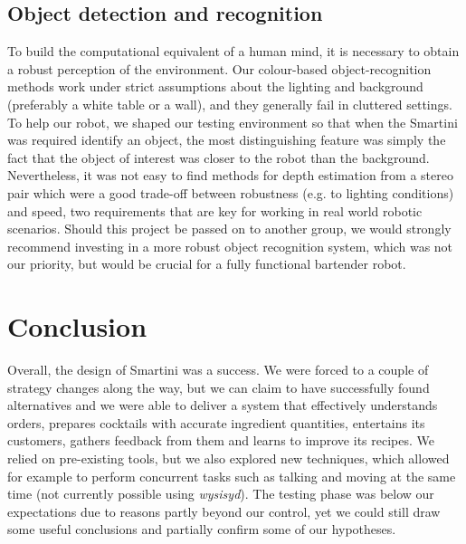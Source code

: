 \documentclass[conference]{IEEEtran}
\begin{document}
\subsection{Object detection and recognition}

To build the computational equivalent of a human mind, it is necessary to obtain a robust perception of the environment. Our colour-based object-recognition methods work under strict assumptions about the lighting and background (preferably a white table or a wall), and they generally fail in cluttered settings. To help our robot, we shaped our testing environment so that when the Smartini was required identify an object, the most distinguishing feature was simply the fact that the object of interest was closer to the robot than the background. Nevertheless, it was not easy to find methods for depth estimation from a stereo pair which were a good trade-off between robustness (e.g. to lighting conditions) and speed, two requirements that are key for working in real world robotic scenarios. Should this project be passed on to another group, we would strongly recommend investing in a more robust object recognition system, which was not our priority, but would be crucial for a fully functional bartender robot. 



\section{Conclusion}

Overall, the design of Smartini was a success. We were forced to a couple of strategy changes along the way, but we can claim to have successfully found alternatives and we were able to deliver a system that effectively understands orders, prepares cocktails with accurate ingredient quantities, entertains its customers, gathers feedback from them and learns to improve its recipes. We relied on pre-existing tools, but we also explored new techniques, which allowed for example to perform concurrent tasks such as talking and moving at the same time (not currently possible using \textit{wysisyd}). The testing phase was below our expectations due to reasons partly beyond our control, yet we could still draw some useful conclusions and partially confirm some of our hypotheses. 


\ifCLASSOPTIONcaptionsoff
  \newpage
\fi
\end{document}
